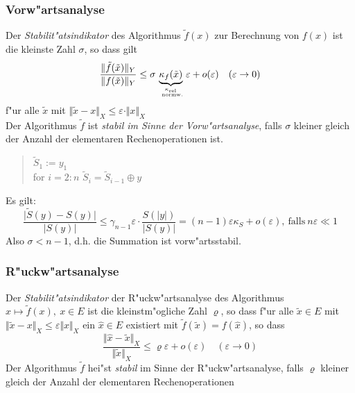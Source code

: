 \documentclass{scrartcl}
\begin{document}
\subsubsection{Vorw"artsanalyse}
\begin{Def} Der \emph{Stabilit"atsindikator} des Algorithmus $\tilde{f}(x)$ zur Berechnung von $f(x)$ ist die kleinste Zahl $\sigma$, so dass gilt
$$ \frac{ \Vert \tilde{f} (\tilde{x}) \Vert_Y}{ \Vert f(\tilde{x}) \Vert_Y } \leq \sigma \underbrace{\kappa_{f} (\tilde{x})}_{\genfrac{}{}{0pt}{}{\kappa_\mathrm{rel}}{ \mathrm{ \ normw.}}} \varepsilon + o(\varepsilon) \quad (\varepsilon \rightarrow 0)$$
f"ur alle $\tilde{x}$ mit $\Vert \tilde{x} - x \Vert_X \leq \varepsilon \cdot \Vert x \Vert_X$ \\
Der Algorithmus $\tilde{f}$ ist \emph{stabil im Sinne der Vorw"artsanalyse}, falls $\sigma$ kleiner gleich der Anzahl der elementaren Rechenoperationen ist.
\end{Def}
\begin{quote}
$\tilde{S}_1 := y_1$ \\
for $i=2:n$ $\tilde{S}_i = \tilde{S}_{i-1} \oplus y$
\end{quote}
Es gilt: 
$$ \frac{\vert \tilde{S} (y) - S(y) \vert}{ \vert S(y) \vert} \leq \gamma_{n-1} \varepsilon \cdot \frac{S(\vert y \vert) }{\vert S(y) \vert } = (n-1) \varepsilon \kappa_S + o(\varepsilon), \ \mathrm{falls \ } n\varepsilon \ll 1$$ 
Also $\sigma < n-1$, d.h. die Summation ist vorw"artsstabil.
\subsubsection{R"uckw"artsanalyse}
\begin{Def}
Der \emph{Stabilit"atsindikator} der R"uckw"artsanalyse des Algorithmus $x \mapsto \tilde{f} (x), \ x \in E$ ist die kleinstm"ogliche Zahl $\varrho$, so dass f"ur alle $\tilde{x} \in E$ mit $\Vert \tilde{x} - x \Vert_X \leq \varepsilon \Vert x \Vert_X$ ein $\hat{x} \in E$ existiert mit $\tilde{f}(\tilde{x}) = f(\hat{x})$, so dass
$$ \frac{ \Vert \hat{x} - \tilde{x} \Vert_X }{ \Vert \tilde{x} \Vert_X} \leq \varrho \varepsilon + o(\varepsilon) \quad (\varepsilon \rightarrow 0)$$
Der Algorithmus $\tilde{f}$ hei"st \emph{stabil} im Sinne der R"uckw"artsanalyse, falls $\varrho$ kleiner gleich der Anzahl der elementaren Rechenoperationen
\end{Def}
\end{document}
